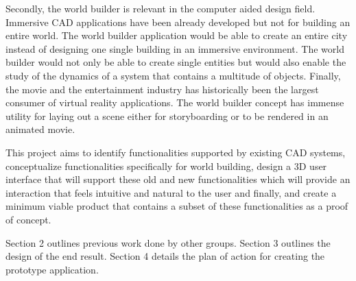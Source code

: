 Secondly, the world builder is relevant in the computer aided design field. Immersive CAD applications have been already developed but not for
building an entire world. The world builder application would be able to create an entire city instead of designing one single building in an immersive 
environment. The world builder would not only be able to create single entities but would also enable the study of the dynamics of a system that contains
a multitude of objects. Finally, the movie and the entertainment industry has historically been the largest consumer of virtual reality 
applications. The world builder concept has immense utility for laying out a scene either for storyboarding or to be rendered in an animated movie.


This project aims to identify functionalities supported by existing CAD systems, conceptualize functionalities specifically for world building, design
a 3D user interface that will support these old and new functionalities which will provide an interaction that feels intuitive and natural to the user
and finally, and create a minimum viable product that contains a subset of these functionalities as a proof of concept.

Section 2 outlines previous work done by other groups.  
Section 3 outlines the design of the end result.
Section 4 details the plan of action for creating the prototype application.
